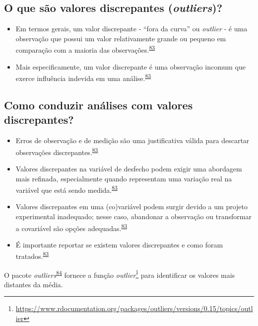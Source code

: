 \documentclass[
  a4paper,
]{book}
\renewcommand{\href}[2]{#2\footnote{\url{#1}}}
\newenvironment{infobox}[1]
  {
  \begin{itemize}
  \renewcommand{\labelitemi}{
    \raisebox{-.7\height}[0pt][0pt]{
      {\setkeys{Gin}{width=3em,keepaspectratio}
        \texttt{[image: \#1]}}
    }
  }
  \setlength{\fboxsep}{1em}
  \begin{blackbox}
  \item
  }
  {
  \end{blackbox}
  \end{itemize}
  }
\begin{document}
\hypertarget{o-que-suxe3o-valores-discrepantes-outliers}{%
\subsection{\texorpdfstring{O que são valores discrepantes (\emph{outliers})?}{O que são valores discrepantes (outliers)?}}\label{o-que-suxe3o-valores-discrepantes-outliers}}

\begin{itemize}
\item
  Em termos gerais, um valor discrepante - ``fora da curva'' ou \emph{outlier} - é uma observação que possui um valor relativamente grande ou pequeno em comparação com a maioria das observações.\textsuperscript{\protect\hyperlink{ref-zuur2009}{83}}
\item
  Mais especificamente, um valor discrepante é uma observação incomum que exerce influência indevida em uma análise.\textsuperscript{\protect\hyperlink{ref-zuur2009}{83}}
\end{itemize}

\hypertarget{como-conduzir-anuxe1lises-com-valores-discrepantes}{%
\subsection{Como conduzir análises com valores discrepantes?}\label{como-conduzir-anuxe1lises-com-valores-discrepantes}}

\begin{itemize}
\item
  Erros de observação e de medição são uma justificativa válida para descartar observações discrepantes.\textsuperscript{\protect\hyperlink{ref-zuur2009}{83}}
\item
  Valores discrepantes na variável de desfecho podem exigir uma abordagem mais refinada, especialmente quando representam uma variação real na variável que está sendo medida.\textsuperscript{\protect\hyperlink{ref-zuur2009}{83}}
\item
  Valores discrepantes em uma (co)variável podem surgir devido a um projeto experimental inadequado; nesse caso, abandonar a observação ou transformar a covariável são opções adequadas.\textsuperscript{\protect\hyperlink{ref-zuur2009}{83}}
\item
  É importante reportar se existem valores discrepantes e como foram tratados.\textsuperscript{\protect\hyperlink{ref-zuur2009}{83}}
\end{itemize}

\begin{infobox}{images/Rlogo}
O pacote \emph{outliers}\textsuperscript{\protect\hyperlink{ref-outliers}{84}} fornece a função \href{https://www.rdocumentation.org/packages/outliers/versions/0.15/topics/outlier}{\emph{outlier}} para identificar os valores mais distantes da média.

\end{infobox}
\end{document}
